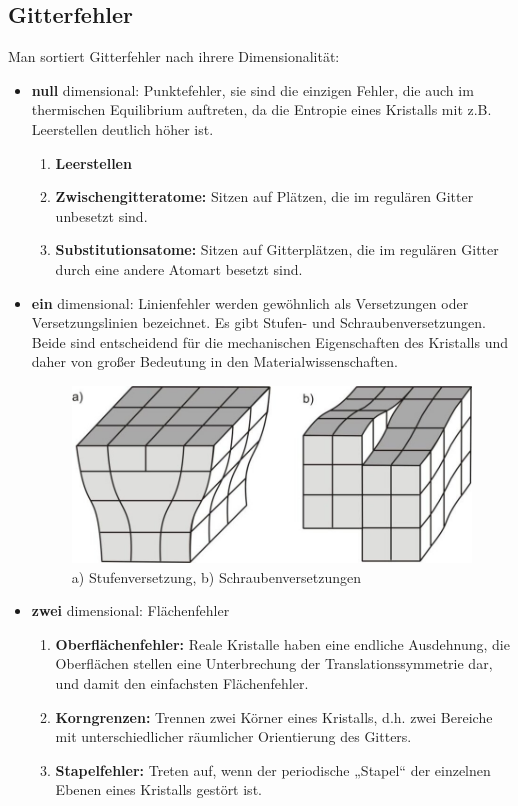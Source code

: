 \documentclass[bfvec]{summery_5.0}
\begin{document}
\subsection{Gitterfehler}
Man sortiert Gitterfehler nach ihrere Dimensionalität:
\begin{itemize}
    \item {\bf null} dimensional: Punktefehler, sie sind die einzigen Fehler, die auch im thermischen Equilibrium auftreten, da die Entropie eines Kristalls mit z.B. Leerstellen deutlich höher ist. 
    \begin{enumerate}
        \item {\bf Leerstellen} 
        \item {\bf Zwischengitteratome:} Sitzen auf Plätzen, die im regulären Gitter unbesetzt sind.
        \item {\bf Substitutionsatome:} Sitzen auf Gitterplätzen, die im regulären Gitter durch eine andere Atomart besetzt sind.
    \end{enumerate}
    \item {\bf ein} dimensional: Linienfehler werden gewöhnlich als Versetzungen oder Versetzungslinien bezeichnet. Es gibt Stufen- und Schraubenversetzungen. Beide sind entscheidend für die mechanischen Eigenschaften des Kristalls und daher von großer Bedeutung in den Materialwissenschaften.
    \begin{figure}[H]
        \centering
        \includegraphics[width=.25\textwidth]{2dfehler.jpg}
        \caption{a) Stufenversetzung, b) Schraubenversetzungen}
    \end{figure}
    \item {\bf zwei} dimensional: Flächenfehler
    \begin{enumerate}
        \item {\bf Oberflächenfehler:} Reale Kristalle haben eine endliche Ausdehnung, die Oberflächen stellen eine Unterbrechung der Translationssymmetrie dar, und damit den einfachsten Flächenfehler.
        \item {\bf Korngrenzen:} Trennen zwei Körner eines Kristalls, d.h. zwei Bereiche mit unterschiedlicher räumlicher Orientierung des Gitters.
        \item {\bf Stapelfehler:} Treten auf, wenn der periodische „Stapel“ der einzelnen Ebenen eines Kristalls gestört ist.
        \begin{figure}[H]

\end{figure}
\end{enumerate}
\end{itemize}
\end{document}
